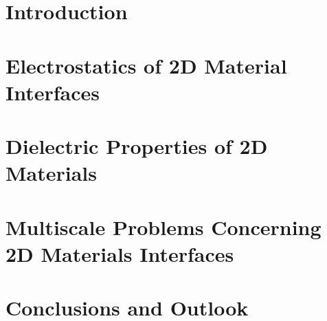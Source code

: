 \documentclass[%
    twoside, openright, titlepage, numbers=noenddot,%
    cleardoublepage=empty,%
    abstractoff,%
    BCOR=5.5mm, paper=a4, fontsize=11pt,%
    ]{scrbook}
\begin{document}
\raggedbottom%

%
%
%

\cleardoublepage\setcounter{page}{1}

%
%




\cleardoublepage
\cleardoublepage
\cleardoublepage
\pagestyle{scrheadings}
\cleardoublepage

%
%

\part{Introduction}
\label{part:introduction}
\newcommand*\imgdir{}
\cleardoublepage{}%



\cleardoublepage%

\part{Electrostatics of 2D Material Interfaces}
\label{part:electr-2d-mater}

\cleardoublepage%

\cleardoublepage

\part{Dielectric Properties of 2D Materials }
\label{part:diel-prop-2d}

\cleardoublepage
\cleardoublepage


\part{Multiscale Problems Concerning 2D Materials Interfaces}
\label{part:mult-probl-conc}

\cleardoublepage
\cleardoublepage
\cleardoublepage


\part{Conclusions and Outlook}
\label{part:conclusions}

\cleardoublepage

\cleardoublepage


\cleardoublepage

\cleardoublepage
\cleardoublepage
\end{document}
